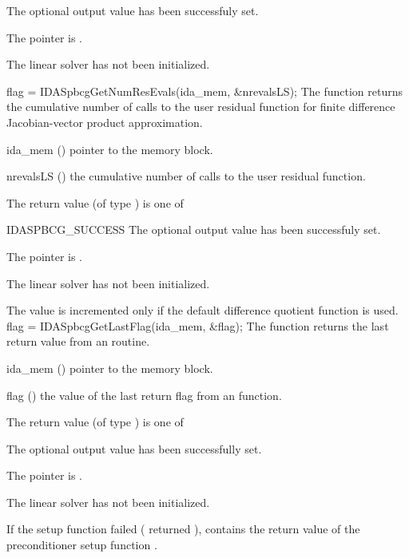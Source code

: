 {{\begin{args}
    The optional output value has been successfuly set.
  \item[\Id{IDASPBCG\_MEM\_NULL}]
    The  pointer is .
  \item[\Id{IDASPBCG\_LMEM\_NULL}]
    The {\idaspbcg} linear solver has not been initialized.
  \end{args}
}
{}
{
  flag = IDASpbcgGetNumResEvals(ida\_mem, \&nrevalsLS);
}
{
  The function  returns the
  cumulative number of calls to the user residual function for
  finite difference Jacobian-vector product approximation.
}
{
  \begin{args}[nrevalsLS]
  \item[ida\_mem] ()
    pointer to the {\ida} memory block.
  \item[nrevalsLS] ()
    the cumulative number of calls to the user residual function.
  \end{args}
}
{
  The return value  (of type ) is one of
  \begin{args}
  \item[IDASPBCG\_SUCCESS] 
    The optional output value has been successfuly set.
  \item[\Id{IDASPBCG\_MEM\_NULL}]
    The  pointer is .
  \item[\Id{IDASPBCG\_LMEM\_NULL}]
    The {\idaspbcg} linear solver has not been initialized.
  \end{args}
}
{
  The value  is incremented only if the default 
   difference quotient function is used.
}
{
  flag = IDASpbcgGetLastFlag(ida\_mem, \&flag);
}
{
  The function  returns the
  last return value from an {\idaspbcg} routine. 
}
{
  \begin{args}
  \item[ida\_mem] ()
    pointer to the {\ida} memory block.
  \item[flag] ()
    the value of the last return flag from an {\idaspbcg} function.
  \end{args}
}
{
  The return value  (of type ) is one of
  \begin{args}
  \item[\Id{IDASPBCG\_SUCCESS}] 
    The optional output value has been successfully set.
  \item[\Id{IDASPBCG\_MEM\_NULL}]
    The  pointer is .
  \item[\Id{IDASPBCG\_LMEM\_NULL}]
    The {\idaspbcg} linear solver has not been initialized.
  \end{args}
}
{
  If the {\idaspbcg} setup function failed ( 
  returned ),
   contains the return value of the preconditioner 
  setup function .

}}
